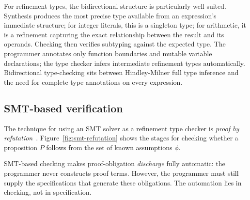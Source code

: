 For refinement types, the bidirectional structure is particularly well-suited. Synthesis produces the most precise type available from an expression's immediate structure; for integer literals, this is a singleton type; for arithmetic, it is a refinement capturing the exact relationship between the result and its operands. Checking then verifies subtyping against the expected type. The programmer annotates only function boundaries and mutable variable declarations; the type checker infers intermediate refinement types automatically. Bidirectional type-checking sits between Hindley-Milner full type inference and the need for complete type annotations on every expression.


\subsection{SMT-based verification}
\label{sec:smt-based-ver}


The technique for using an SMT solver as a refinement type checker is \textit{proof by refutation}~\cite{Rondon2008Liquid}. Figure~\ref{fig:smt-refutation} shows the stages for checking whether a proposition $P$ follows from the set of known assumptions $\phi$.

SMT-based checking makes proof-obligation \textit{discharge} fully automatic: the programmer never constructs proof terms. However, the programmer must still supply the specifications that generate these obligations. The automation lies in checking, not in specification.

